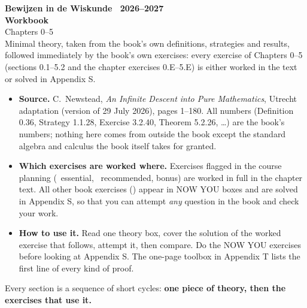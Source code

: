 \thispagestyle{empty}
\begin{tcolorbox}[enhanced, colback=hblue, colframe=hblue, boxrule=0pt, arc=4pt, left=16pt, right=16pt, top=22pt, bottom=22pt]
  \color{white}\sffamily
  {\large\bfseries Bewijzen in de Wiskunde \textperiodcentered\ 2026--2027}\\[10pt]
  {\fontsize{34}{38}\selectfont\bfseries Workbook}\\[6pt]
  {\fontsize{20}{24}\selectfont Chapters 0--5}\\[14pt]
  {\normalsize Minimal theory, taken from the book's own definitions, strategies and results, followed immediately by the book's own exercises: every exercise of Chapters 0--5 (sections 0.1--5.2 and the chapter exercises 0.E--5.E) is either worked in the text or solved in Appendix S.}
\end{tcolorbox}

\vspace{10pt}
\begin{tcolorbox}[enhanced, colback=white, colframe=hblue2, boxrule=0.8pt, arc=2pt, left=10pt, right=10pt, top=8pt, bottom=8pt]
\sffamily\small\sloppy
\begin{itemize}[leftmargin=1.2em]
\item \textbf{\textcolor{hblue}{Source.}} C.~Newstead, \emph{An Infinite Descent into Pure Mathematics}, Utrecht adaptation (version of 29 July 2026), pages 1--180. All numbers (Definition 0.36, Strategy 1.1.28, Exercise 3.2.40, Theorem 5.2.26, \dots) are the book's numbers; nothing here comes from outside the book except the standard algebra and calculus the book itself takes for granted.
\item \textbf{\textcolor{hblue}{Which exercises are worked where.}} Exercises flagged in the course planning (\fE\ essential, \fR\ recommended, bonus) are worked in full in the chapter text. All other book exercises (\fO) appear in NOW YOU boxes and are solved in Appendix S, so that you can attempt \emph{any} question in the book and check your work.
\item \textbf{\textcolor{hblue}{How to use it.}} Read one theory box, cover the solution of the worked exercise that follows, attempt it, then compare. Do the NOW YOU exercises before looking at Appendix S. The one-page toolbox in Appendix T lists the first line of every kind of proof.
\end{itemize}
\end{tcolorbox}

\vspace{8pt}
Every section is a sequence of short cycles: \textbf{one piece of theory, then the exercises that use it.}

